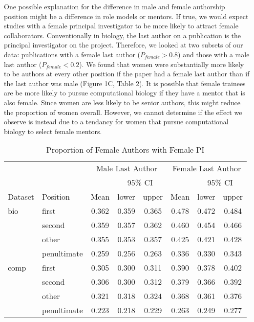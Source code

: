 \documentclass[10pt,letterpaper]{article}
\begin{document}
\begin{flushleft}
One possible explanation for the difference in male and female authorship position might be a difference in role models or mentors. If true, we would expect studies with a female principal investigator to be more likely to attract female collaborators. Conventionally in biology,  the last author on a publication is the principal investigator on the project. Therefore, we looked at two subsets of our data: publications with a female last author ($P_{female} > 0.8$) and those with a male last author ($P_{female} < 0.2$). We found that women were substantially more likely to be authors at every other position if the paper had a female last author than if the last author was male (Figure 1C, Table 2). It is possible that female trainees are be more likely to pursue computational biology if they have a mentor that is also female. Since women are less likely to be senior authors, this might reduce the proportion of women overall. However, we cannot determine if the effect we observe is instead due to a tendancy for women that pursue computational biology to select female mentors.

\begin{table}[]
\centering
\caption{Proportion of Female Authors with Female PI}
\label{Table 2}
\begin{tabular}{llcccccc}
\toprule
        &                 & \multicolumn{3}{c}{Male Last Author} & \multicolumn{3}{c}{Female Last Author} \\
\cmidrule(r){3-8}
        &                 &       & \multicolumn{2}{c}{95\% CI}  &        & \multicolumn{2}{c}{95\% CI}   \\
\cmidrule(r){4-5}\cmidrule(r){7-8}
Dataset & Position        & Mean  & lower        & upper         & Mean   & lower        & upper          \\
\midrule
bio     & first           & 0.362 & 0.359        & 0.365          & 0.478 & 0.472        & 0.484          \\
        & second          & 0.359 & 0.357        & 0.362          & 0.460 & 0.454        & 0.466          \\
        & other           & 0.355 & 0.353        & 0.357          & 0.425 & 0.421        & 0.428          \\
        & penultimate     & 0.259 & 0.256        & 0.263          & 0.336 & 0.330        & 0.343          \\
comp    & first           & 0.305 & 0.300        & 0.311          & 0.390 & 0.378        & 0.402          \\
        & second          & 0.306 & 0.300        & 0.312          & 0.379 & 0.366        & 0.392          \\
        & other           & 0.321 & 0.318        & 0.324          & 0.368 & 0.361        & 0.376          \\
        & penultimate     & 0.223 & 0.218        & 0.229          & 0.263 & 0.249        & 0.277          \\
\bottomrule
\end{tabular}
\end{table}


\end{flushleft}
\end{document}

